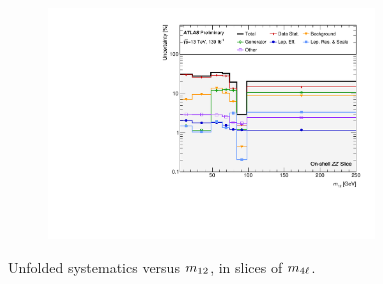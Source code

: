 \begin{figure}[hp]
    \begin{subfigure}{.49\textwidth}\centering\includegraphics[width = 0.95\textwidth]{Figures/m4l/Systematics/Unfolded/UnfoldedSys_m12_vs_M4l_Stack_Paper3.pdf}\end{subfigure}
    \caption{Unfolded systematics versus $m_{12}$, in slices of $m_{4\ell}$.}
\end{figure}

